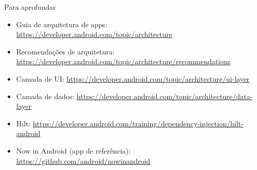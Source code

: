 \documentclass[aspectratio=169,10pt]{beamer}
\begin{document}
\begin{frame}{Para aprofundar}
  \small
  \begin{itemize}
    \item Guia de arquitetura de apps: \url{https://developer.android.com/topic/architecture}
    \item Recomendações de arquitetura: \url{https://developer.android.com/topic/architecture/recommendations}
    \item Camada de UI: \url{https://developer.android.com/topic/architecture/ui-layer}
    \item Camada de dados: \url{https://developer.android.com/topic/architecture/data-layer}
    \item Hilt: \url{https://developer.android.com/training/dependency-injection/hilt-android}
    \item Now in Android (app de referência): \url{https://github.com/android/nowinandroid}
  \end{itemize}
\end{frame}

\end{document}
